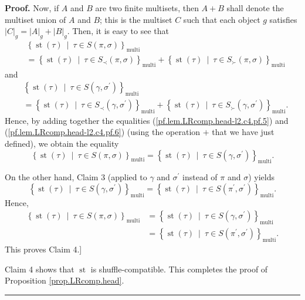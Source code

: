 \documentclass[numbers=enddot,12pt,final,onecolumn,notitlepage]{scrartcl}%
\theoremstyle{definition}
\newenvironment{proof}[1][Proof]{\noindent\textbf{#1.} }{\ \rule{0.5em}{0.5em}}
\newenvironment{verlong}{}{}
\begin{document}
\begin{verlong}
\begin{proof}
Now, if $A$ and $B$ are two finite multisets, then $A+B$ shall denote the
multiset union of $A$ and $B$; this is the multiset $C$ such that each object
$g$ satisfies $\left\vert C\right\vert _{g}=\left\vert A\right\vert
_{g}+\left\vert B\right\vert _{g}$. Then, it is easy to see that%
\begin{align*}
&  \left\{  \operatorname*{st}\left(  \tau\right)  \ \mid\ \tau\in S\left(
\pi,\sigma\right)  \right\}  _{\operatorname*{multi}}\\
&  =\left\{  \operatorname*{st}\left(  \tau\right)  \ \mid\ \tau\in S_{\prec
}\left(  \pi,\sigma\right)  \right\}  _{\operatorname*{multi}}+\left\{
\operatorname*{st}\left(  \tau\right)  \ \mid\ \tau\in S_{\succ}\left(
\pi,\sigma\right)  \right\}  _{\operatorname*{multi}}%
\end{align*}
and
\begin{align*}
&  \left\{  \operatorname*{st}\left(  \tau\right)  \ \mid\ \tau\in S\left(
\gamma,\sigma^{\prime}\right)  \right\}  _{\operatorname*{multi}}\\
&  =\left\{  \operatorname*{st}\left(  \tau\right)  \ \mid\ \tau\in S_{\prec
}\left(  \gamma,\sigma^{\prime}\right)  \right\}  _{\operatorname*{multi}%
}+\left\{  \operatorname*{st}\left(  \tau\right)  \ \mid\ \tau\in S_{\succ
}\left(  \gamma,\sigma^{\prime}\right)  \right\}  _{\operatorname*{multi}}.
\end{align*}
Hence, by adding together the equalities (\ref{pf.lem.LRcomp.head-l2.c4.pf.5})
and (\ref{pf.lem.LRcomp.head-l2.c4.pf.6}) (using the operation $+$ that we
have just defined), we obtain the equality%
\[
\left\{  \operatorname*{st}\left(  \tau\right)  \ \mid\ \tau\in S\left(
\pi,\sigma\right)  \right\}  _{\operatorname*{multi}}=\left\{
\operatorname*{st}\left(  \tau\right)  \ \mid\ \tau\in S\left(  \gamma
,\sigma^{\prime}\right)  \right\}  _{\operatorname*{multi}}.
\]


On the other hand, Claim 3 (applied to $\gamma$ and $\sigma^{\prime}$ instead
of $\pi$ and $\sigma$) yields%
\[
\left\{  \operatorname*{st}\left(  \tau\right)  \ \mid\ \tau\in S\left(
\gamma,\sigma^{\prime}\right)  \right\}  _{\operatorname*{multi}}=\left\{
\operatorname*{st}\left(  \tau\right)  \ \mid\ \tau\in S\left(  \pi^{\prime
},\sigma^{\prime}\right)  \right\}  _{\operatorname*{multi}}.
\]
Hence,%
\begin{align*}
\left\{  \operatorname*{st}\left(  \tau\right)  \ \mid\ \tau\in S\left(
\pi,\sigma\right)  \right\}  _{\operatorname*{multi}}  &  =\left\{
\operatorname*{st}\left(  \tau\right)  \ \mid\ \tau\in S\left(  \gamma
,\sigma^{\prime}\right)  \right\}  _{\operatorname*{multi}}\\
&  =\left\{  \operatorname*{st}\left(  \tau\right)  \ \mid\ \tau\in S\left(
\pi^{\prime},\sigma^{\prime}\right)  \right\}  _{\operatorname*{multi}}.
\end{align*}
This proves Claim 4.]

Claim 4 shows that $\operatorname*{st}$ is shuffle-compatible. This completes
the proof of Proposition \ref{prop.LRcomp.head}.
\end{proof}
\end{verlong}
\end{document}
